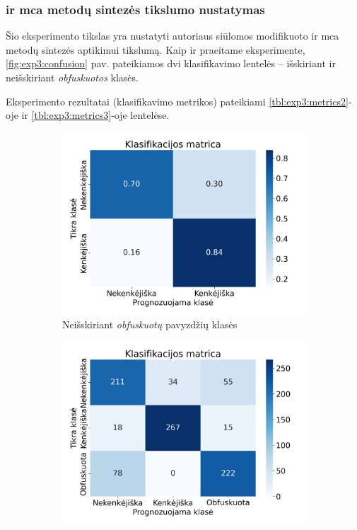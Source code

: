 \subsubsection{\LIME ir \gls{mca} metodų sintezės tikslumo nustatymas}\label{sec:exp:3}

Šio eksperimento tikslas yra nustatyti autoriaus siūlomos modifikuoto \LIME ir \gls{mca} metodų sintezės  aptikimui tikslumą. Kaip ir praeitame eksperimente, \ref{fig:exp3:confusion} pav. pateikiamos dvi klasifikavimo lentelės -- išskiriant ir neišskiriant \textit{obfuskuotos} klasės. 

Eksperimento rezultatai (klasifikavimo metrikos) pateikiami \ref{tbl:exp3:metrics2}-oje ir \ref{tbl:exp3:metrics3}-oje lentelėse.

\begin{figure}[h]
    \begin{subfigure}{0.5\textwidth}
        \centering
        \includegraphics[width=\textwidth]{images/synthesis_2x2.png}
        \caption{Neišskiriant \textit{obfuskuotų} pavyzdžių klasės}
    \end{subfigure}
    \begin{subfigure}{0.5\textwidth}
        \centering
        \includegraphics[width=\textwidth]{images/synthesis_3x3.png}

\end{subfigure}
\end{figure}

